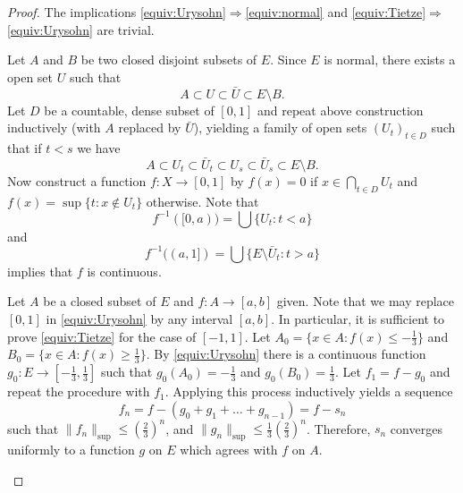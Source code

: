 \begin{proof}
	The implications \ref{equiv:Urysohn}$\Rightarrow$\ref{equiv:normal} and \ref{equiv:Tietze}$\Rightarrow$\ref{equiv:Urysohn} are trivial.
	
\begin{description}[leftmargin=.25 cm]
	\item[\ref{equiv:normal}$\Rightarrow$\ref{equiv:Urysohn}:] Let $A$ and $B$ be two closed disjoint subsets of $E$. Since  $E$ is normal, there exists a open set $U$ such that
	\[
	A\subset U\subset \bar{U}\subset E\setminus B.
	\]
	Let $D$ be a countable, dense subset of $[0,1]$ and repeat above construction inductively (with $A$ replaced by $\bar{U}$), yielding a family of open sets $(U_t)_{t\in D}$ such that if $t<s$ we have
	\[
	A\subset U_t\subset \bar{U}_t\subset U_s\subset \bar{U}_s\subset E\setminus B.
	\]
	Now construct a function $f:X\to [0,1]$ by $f(x)=0$ if $x\in \bigcap_{t\in D} U_t$ and $f(x)=\sup\{t:x\not\in U_t\}$ otherwise. Note that
	\[
	f^{-1}([0,a))=\bigcup \{U_t: t<a\}
	\]
	and
	\[
	f^{-1}((a,1])=\bigcup \{E\setminus\bar{U}_t:t>a \}
	\]
	implies that $f$ is continuous.
	\item[\ref{equiv:Urysohn}$\Rightarrow$\ref{equiv:Tietze}:] Let $A$ be a closed subset of $E$ and $f:A\to [a,b]$ given. Note that we may replace $[0,1]$ in \ref{equiv:Urysohn} by any interval $[a,b]$. In particular, it is sufficient to prove \ref{equiv:Tietze} for the case of $[-1,1]$. Let $A_0=\{x\in A: f(x)\leq -\frac{1}{3}\}$ and $B_0=\{x\in A: f(x)\geq \frac{1}{3}\}$. By \ref{equiv:Urysohn} there is a continuous function $g_0: E\to [-\frac{1}{3},\frac{1}{3}]$ such that $g_0(A_0)=-\frac{1}{3}$ and $g_0(B_0)=\frac{1}{3}$. Let $f_1=f-g_0$ and repeat the procedure with $f_1$. Applying this process inductively yields a sequence
	\[
	f_n=f-(g_0+g_1+\dots+g_{n-1})=f-s_n
	\]
	such that $\|f_n\|_{\sup}\leq \left(\frac{2}{3}\right)^n$,
	 and $\|g_n\|_{\sup}\leq \frac{1}{3}\left(\frac{2}{3}\right)^n$. Therefore, $s_n$ converges uniformly to a function $g$ on $E$ which agrees with $f$ on $A$.\qedhere
\end{description}
\end{proof}


